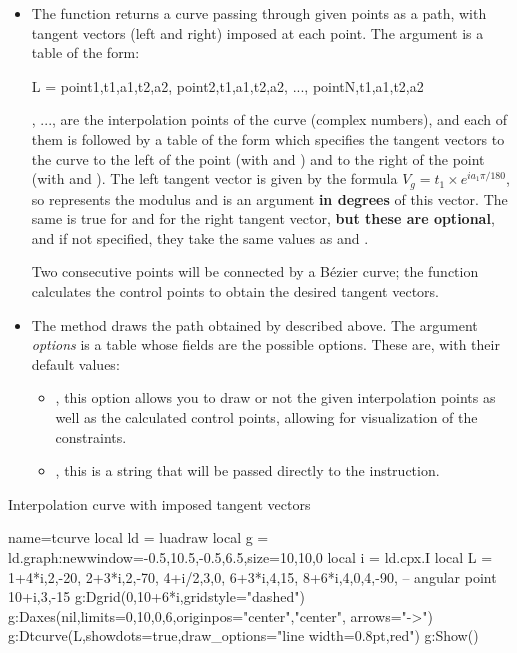 \begin{itemize}
    \item The function  returns a curve passing through given points as a path, with tangent vectors (left and right) imposed at each point. The argument  is a table of the form:
\begin{Luacode}
L = {point1,{t1,a1,t2,a2}, point2,{t1,a1,t2,a2}, ..., pointN,{t1,a1,t2,a2}}
\end{Luacode}
, ...,  are the interpolation points of the curve (complex numbers), and each of them is followed by a table of the form  which specifies the tangent vectors to the curve to the left of the point (with  and ) and to the right of the point (with  and ). The left tangent vector is given by the formula $V_g = t_1\times e^{ia_1\pi/180}$, so  represents the modulus and  is an argument \textbf{in degrees} of this vector. The same is true for  and  for the right tangent vector, \textbf{but these are optional}, and if not specified, they take the same values ​​as  and .

Two consecutive points will be connected by a Bézier curve; the function calculates the control points to obtain the desired tangent vectors.

    \item The method  draws the path obtained by  described above. The argument \emph{options} is a table whose fields are the possible options. These are, with their default values:
    \begin{itemize}
        \item {}, this option allows you to draw or not the given interpolation points as well as the calculated control points, allowing for visualization of the constraints.
        \item {}, this is a string that will be passed directly to the \drawcmd instruction.
    \end{itemize}
\end{itemize}    

\begin{demo}{Interpolation curve with imposed tangent vectors}
\begin{luadraw}{name=tcurve}
local ld = luadraw
local g = ld.graph:new{window={-0.5,10.5,-0.5,6.5},size={10,10,0}}
local i = ld.cpx.I
local L = {
1+4*i,{2,-20},
2+3*i,{2,-70},
4+i/2,{3,0},
6+3*i,{4,15},
8+6*i,{4,0,4,-90}, -- angular point
10+i,{3,-15}}
g:Dgrid({0,10+6*i},{gridstyle="dashed"})
g:Daxes(nil,{limits={{0,10},{0,6}},originpos={"center","center"}, arrows="->"})
g:Dtcurve(L,{showdots=true,draw_options="line width=0.8pt,red"})
g:Show()
\end{luadraw}
\end{demo}

